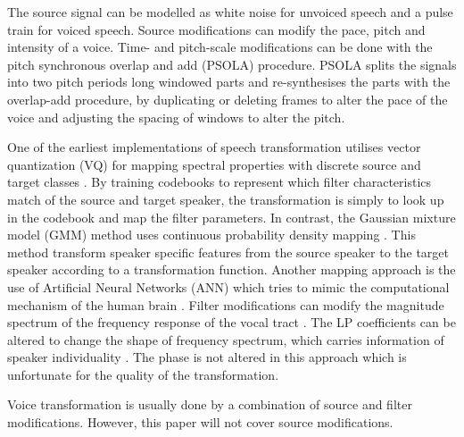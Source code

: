 The source signal can be modelled as white noise for unvoiced speech and a pulse train for voiced speech. Source modifications can modify the pace, pitch and intensity of a voice. Time- and pitch-scale modifications can be done with the pitch synchronous overlap and add (PSOLA) procedure. PSOLA splits the signals into two pitch periods long windowed parts and re-synthesises the parts with the overlap-add procedure, by duplicating or deleting frames to alter the pace of the voice and adjusting the spacing of windows to alter the pitch.

One of the earliest implementations of speech transformation utilises vector quantization (VQ) for mapping spectral properties with discrete source and target classes \cite{abe88}. By training codebooks to represent which filter characteristics match of the source and target speaker, the transformation is simply to look up in the codebook and map the filter parameters. In contrast, the Gaussian mixture model (GMM) method uses continuous probability density mapping \cite{stylianou98}. This method transform speaker specific features from the source speaker to the target speaker according to a transformation function. Another mapping approach is the use of Artificial Neural Networks (ANN) which tries to mimic the computational mechanism of the human brain \cite{desai09,young75}. Filter modifications can modify the magnitude spectrum of the frequency response of the vocal tract \cite{nguyen09}. The LP coefficients can be altered to change the shape of frequency spectrum, which carries information of speaker individuality \cite{stylianou09}. The phase is not altered in this approach which is unfortunate for the quality of the transformation. 

Voice transformation is usually done by a combination of source and filter modifications. However, this paper will not cover source modifications.

